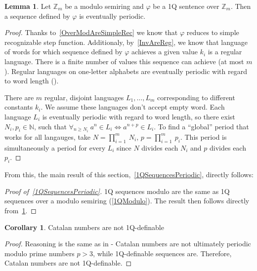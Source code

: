 \documentclass[12pt]{article}
\theoremstyle{definition}
\newtheorem{corollary}{Corollary}[section]
\newtheorem{lemma}[theorem]{Lemma}
\begin{document}

\begin{lemma}
    \label{OverModAreSimpleRec2}
    Let $\mathbb{Z}_m$ be a modulo semiring and $\varphi$ be a 1Q sentence over $\mathbb{Z}_m$. Then a sequence defined by $\varphi$ is eventually periodic.
\end{lemma}

\begin{proof}
    Thanks to~\cref{OverModAreSimpleRec} we know that $\varphi$ reduces to simple recognizable step function. Additionaly, by~\ref{InvAreReg}, we know that language of words for which sequence defined by $\varphi$ achieves a given value $k_i$ is a regular language. There is a finite number of values this sequence can achieve (at most $m$). Regular languages on one-letter alphabets are eventually periodic with regard to word length (\cite[Theorem 1]{PighizziniS02}).

    There are $m$ regular, disjoint languages $L_1, \ldots, L_m$ corresponding to different constants $k_i$. We assume these languages don't accept empty word. Each language $L_i$ is eventually periodic with regard to word length, so there exist $N_i, p_i \in \mathbb{N}$, such that $\forall_{n \geq N_i} \ a^n \in L_i \iff a^{n + p} \in L_i$. To find a ``global'' period that works for all langauges, take $N = \prod_{i=1}^m \ N_i$, $p = \prod_{i=1}^m \ p_i$. This period is simultaneously a period for every $L_i$ since $N$ divides each $N_i$ and $p$ divides each $p_i$.
\end{proof}

From this, the main result of this section,~\cref{1QSequencesPeriodic}, directly follows:

\begin{proof}[Proof of~\cref{1QSequencesPeriodic}]
    1Q sequences modulo are the same as 1Q sequences over a modulo semiring (\cref{1QModulo}). The result then follows directly from~\cref{OverModAreSimpleRec2}.
\end{proof}

\begin{corollary}
    Catalan numbers are not 1Q-definable
\end{corollary}

\begin{proof}
    Reasoning is the same as in \cite[Theorem 7, Corollary 8]{CadilhacMPPS20} - Catalan numbers are not ultimately periodic modulo prime numbers $p > 3$, while 1Q-definable sequences are. Therefore, Catalan numbers are not 1Q-definable.
\end{proof}
\end{document}
